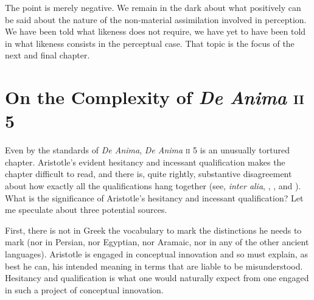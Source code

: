 The point is merely negative. We remain in the dark about what positively can be said about the nature of the non-material assimilation involved in perception. We have been told what likeness does not require, we have yet to have been told in what likeness consists in the perceptual case. That topic is the focus of the next and final chapter.


\section{On the Complexity of \emph{De Anima} \textsc{ii} 5} %
\label{sec:on_the_complexity_of_de anima_ii_5}

Even by the standards of \emph{De Anima}, \emph{De Anima} \textsc{ii} 5 is an unusually tortured chapter. Aristotle's evident hesitancy and incessant qualification makes the chapter difficult to read, and there is, quite rightly, substantive disagreement about how exactly all the qualifications hang together (see, \emph{inter alia}, \citealt{Burnyeat:2002an}, \citealt{Heinaman:2007ys}, and \citealt{Bowin:2011uq}). What is the significance of Aristotle's hesitancy and incessant qualification? Let me speculate about three potential sources. 

First, there is not in Greek the vocabulary to mark the distinctions he needs to mark (nor in Persian, nor Egyptian, nor Aramaic, nor in any of the other ancient languages). Aristotle is engaged in conceptual innovation and so must explain, as best he can, his intended meaning in terms that are liable to be misunderstood. Hesitancy and qualification is what one would naturally expect from one engaged in such a project of conceptual innovation. 

